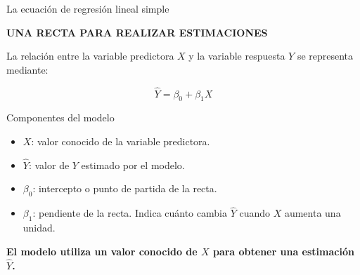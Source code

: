 \documentclass[aspectratio=169,11pt]{beamer}
\newcommand{\kicker}[1]{%
  {\scriptsize\bfseries\color{cAcc}\MakeUppercase{#1}}%
  \par\vspace{0.2em}%
}
\newcommand{\destaca}[1]{%
  {\color{cPrim}\bfseries #1}%
}
\newenvironment{cerrado}[1]
  {\begin{block}{#1}
   \begin{minipage}{\linewidth}
   \raggedright}
  {\end{minipage}
   \end{block}}
\begin{document}
\begin{frame}{La ecuación de regresión lineal simple}

  \begin{center}
    \begin{minipage}{0.88\textwidth}

      \kicker{UNA RECTA PARA REALIZAR ESTIMACIONES}

      La relación entre la variable predictora \(X\) y la variable
      respuesta \(Y\) se representa mediante:

      \vspace{0.0em}

      \[
        \hat{Y}=\beta_0+\beta_1X
      \]

      \vspace{0.0em}

      \begin{cerrado}{Componentes del modelo}

        \small

        \begin{itemize}
          \setlength{\itemsep}{0.15em}

          \item \(X\): valor conocido de la variable predictora.

          \item \(\hat{Y}\): valor de \(Y\) estimado por el modelo.

          \item \(\beta_0\): intercepto o punto de partida de la recta.

          \item \(\beta_1\): pendiente de la recta. Indica cuánto cambia
          \(\hat{Y}\) cuando \(X\) aumenta una unidad.

        \end{itemize}

      \end{cerrado}

      \vspace{0.0em}

      \begin{center}
        \destaca{El modelo utiliza un valor conocido de \(X\)
        para obtener una estimación \(\hat{Y}\).}
      \end{center}

    \end{minipage}
  \end{center}

\end{frame}
\end{document}
